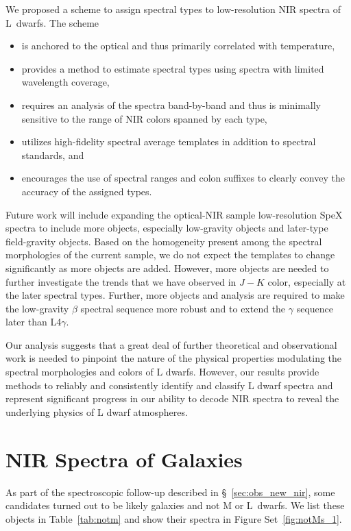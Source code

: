 \documentclass[12pt]{aastex6}
\begin{document}
We proposed a scheme to assign spectral types to low-resolution NIR spectra of L~dwarfs.
The scheme
\begin{itemize}
\item is anchored to the optical and thus primarily correlated with temperature,
\item provides a method to estimate spectral types using spectra with limited wavelength coverage,
\item requires an analysis of the spectra band-by-band and thus is minimally sensitive to the range of NIR colors spanned by each type,
\item utilizes high-fidelity spectral average templates in addition to spectral standards, and
\item encourages the use of spectral ranges and colon suffixes to clearly convey the accuracy of the assigned types.
\end{itemize}

Future work will include expanding the optical-NIR sample low-resolution SpeX spectra to include more objects, especially low-gravity objects and later-type field-gravity objects.
Based on the homogeneity present among the spectral morphologies of the current sample, we do not expect the templates to change significantly as more objects are added.
However, more objects are needed to further investigate the trends that we have observed in $J-K$ color, especially at the later spectral types.
Further, more objects and analysis are required to make the low-gravity $\beta$ spectral sequence more robust and to extend the $\gamma$ sequence later than L4$\gamma$.

Our analysis suggests that a great deal of further theoretical and observational work is needed to pinpoint the nature of the physical properties modulating the spectral morphologies and colors of L dwarfs.
However, our results provide methods to reliably and consistently identify and classify L dwarf spectra and represent significant progress in our ability to decode NIR spectra to reveal the underlying physics of L dwarf atmospheres.

\appendix
\section{NIR Spectra of Galaxies}
\label{sec:galaxies}
As part of the spectroscopic follow-up described in \S~\ref{sec:obs_new_nir}, some candidates turned out to be likely galaxies and not M or L~dwarfs. We list these objects in Table~\ref{tab:notm} and show their spectra in Figure Set~\ref{fig:notMs_1}.
\end{document}
